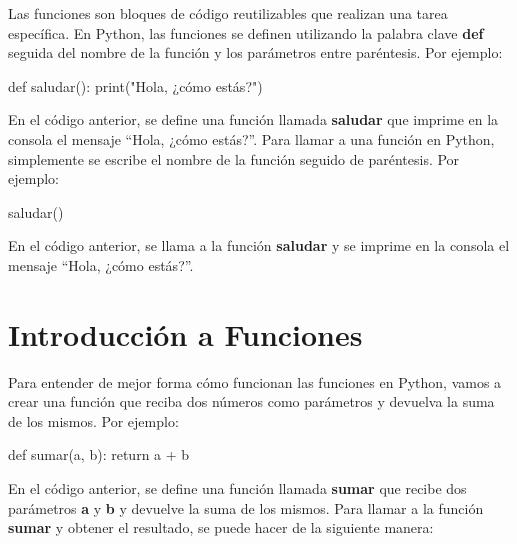 \documentclass[
  a4paper,
  DIV=11,
  numbers=noendperiod,
  onepage,
  openany]{scrreprt}
\newenvironment{Shaded}{\begin{snugshade}}{\end{snugshade}}
\newcommand{\BuiltInTok}[1]{\textcolor[rgb]{0.00,0.23,0.31}{#1}}
\newcommand{\ControlFlowTok}[1]{\textcolor[rgb]{0.00,0.23,0.31}{#1}}
\newcommand{\KeywordTok}[1]{\textcolor[rgb]{0.00,0.23,0.31}{#1}}
\newcommand{\NormalTok}[1]{\textcolor[rgb]{0.00,0.23,0.31}{#1}}
\newcommand{\OperatorTok}[1]{\textcolor[rgb]{0.37,0.37,0.37}{#1}}
\newcommand{\StringTok}[1]{\textcolor[rgb]{0.13,0.47,0.30}{#1}}
\begin{document}
Las funciones son bloques de código reutilizables que realizan una tarea
específica. En Python, las funciones se definen utilizando la palabra
clave \textbf{def} seguida del nombre de la función y los parámetros
entre paréntesis. Por ejemplo:

\begin{Shaded}
\begin{Highlighting}[]
\KeywordTok{def}\NormalTok{ saludar():}
    \BuiltInTok{print}\NormalTok{(}\StringTok{"Hola, ¿cómo estás?"}\NormalTok{)}
\end{Highlighting}
\end{Shaded}

En el código anterior, se define una función llamada \textbf{saludar}
que imprime en la consola el mensaje ``Hola, ¿cómo estás?''. Para llamar
a una función en Python, simplemente se escribe el nombre de la función
seguido de paréntesis. Por ejemplo:

\begin{Shaded}
\begin{Highlighting}[]
\NormalTok{saludar()}
\end{Highlighting}
\end{Shaded}

En el código anterior, se llama a la función \textbf{saludar} y se
imprime en la consola el mensaje ``Hola, ¿cómo estás?''.

\section{Introducción a Funciones}\label{introducciuxf3n-a-funciones}

Para entender de mejor forma cómo funcionan las funciones en Python,
vamos a crear una función que reciba dos números como parámetros y
devuelva la suma de los mismos. Por ejemplo:

\begin{Shaded}
\begin{Highlighting}[]
\KeywordTok{def}\NormalTok{ sumar(a, b):}
    \ControlFlowTok{return}\NormalTok{ a }\OperatorTok{+}\NormalTok{ b}
\end{Highlighting}
\end{Shaded}

En el código anterior, se define una función llamada \textbf{sumar} que
recibe dos parámetros \textbf{a} y \textbf{b} y devuelve la suma de los
mismos. Para llamar a la función \textbf{sumar} y obtener el resultado,
se puede hacer de la siguiente manera:
\end{document}
